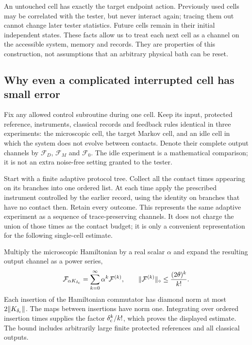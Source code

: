 \documentclass[11pt,a4paper]{article}
\numberwithin{equation}{section}
\theoremstyle{remark}
\begin{document}
An untouched cell has exactly the target endpoint action. Previously
used cells may be correlated with the tester, but never interact again;
tracing them out cannot change later tester statistics. Future cells
remain in their initial independent states. These facts allow us to
treat each next cell as a channel on the accessible system, memory
and records. They are properties of this construction, not assumptions
that an arbitrary physical bath can be reset.

\subsection{Why even a complicated interrupted cell has small error}
\label{sim:cell-bound}

Fix any allowed control subroutine during one cell. Keep its input,
protected reference, instruments, classical records and feedback rules
identical in three experiments: the microscopic cell, the target Markov
cell, and an idle cell in which the system does not evolve between
contacts. Denote their complete output channels by $\mathcal F_D$,
$\mathcal F_M$ and $\mathcal F_0$. The idle experiment is a mathematical
comparison; it is not an extra noise-free setting granted to the tester.

Start with a finite adaptive protocol tree. Collect all the contact times
appearing on its branches into one ordered list. At each time apply the
prescribed instrument controlled by the earlier record, using the identity
on branches that have no contact then. Retain every outcome. This represents
the same adaptive experiment as a sequence of trace-preserving channels.
It does not charge the union of those times as the contact budget; it is
only a convenient representation for the following single-cell estimate.

Multiply the microscopic Hamiltonian by a real scalar $\alpha$ and
expand the resulting output channel as a power series,
\begin{equation}
 \mathcal F_{\alpha K_{\delta_{\rm c}}}
 =\sum_{k=0}^\infty\alpha^k\mathcal F^{(k)},
 \qquad \|\mathcal F^{(k)}\|_\diamond
 \le\frac{(2\theta)^k}{k!}.
 \label{sim:dyson-bound}
\end{equation}
Each insertion of the Hamiltonian commutator has diamond norm at most
$2\|K_{\delta_{\rm c}}\|$. The maps between insertions have norm one. Integrating
over ordered insertion times supplies the factor $\delta_{\rm c}^k/k!$, which proves
the displayed estimate. The bound includes arbitrarily large finite
protected references and all classical outputs.
\end{document}
